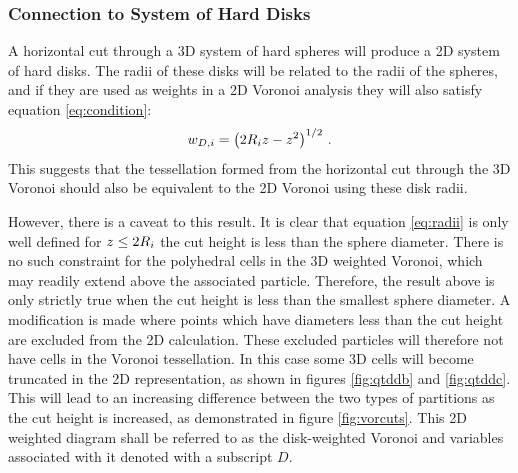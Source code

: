 \subsubsection{Connection to System of Hard Disks}

A horizontal cut through a 3D system of hard spheres will produce a 2D system of hard disks.
The radii of these disks will be related to the radii of the spheres, and if they are used as weights in a 2D Voronoi analysis they will also satisfy equation \eqref{eq:condition}:
\begin{equation}
	\label{eq:radii}
	w_{D,i}  = \left(2R_i z-z^2\right)^{1/2}\,.
\end{equation}
This suggests that the tessellation formed from the horizontal cut through the 3D Voronoi should also be equivalent to the 2D Voronoi using these disk radii.

However, there is a caveat to this result. 
It is clear that equation \eqref{eq:radii} is only well defined for $z\leq 2R_i$ \ie{} the cut height is less than the sphere diameter.
There is no such constraint for the polyhedral cells in the 3D weighted Voronoi, which may readily extend above the associated particle.
Therefore, the result above is only strictly true when the cut height is less than the smallest sphere diameter.
A modification is made where points which have diameters less than the cut height are excluded from the 2D calculation.
These excluded particles will therefore not have cells in the Voronoi tessellation.
In this case some 3D cells will become truncated in the 2D representation, as shown in figures \ref{fig:qtddb} and \ref{fig:qtddc}.
This will lead to an increasing difference between the two types of partitions as the cut height is increased, as demonstrated in figure \ref{fig:vorcuts}.
This 2D weighted diagram shall be referred to as the disk\--weighted Voronoi and variables associated with it denoted with a subscript $D$.

